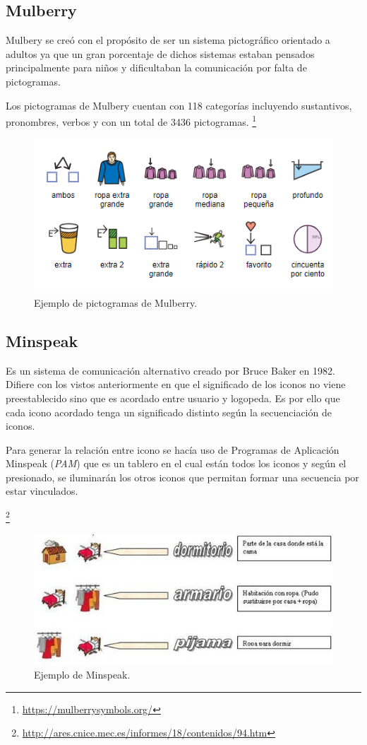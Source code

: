 \newpage
\subsection{Mulberry}
Mulbery se creó con el propósito de ser un sistema pictográfico orientado a adultos ya que un gran porcentaje de dichos sistemas estaban pensados principalmente para niños y dificultaban la comunicación por falta de pictogramas.

Los pictogramas de Mulbery cuentan con 118 categorías incluyendo sustantivos, pronombres, verbos y con un total de 3436 pictogramas.
\footnote{\url{https://mulberrysymbols.org/}}


\begin{figure}[h!]
	\centering
	\includegraphics[scale=0.7]{Imagenes/Bitmap/Mulberry}
	\caption{Ejemplo de pictogramas de Mulberry.}
	\label{fig:mulberry}
\end{figure}

\newpage
\subsection{Minspeak}
Es un sistema de comunicación alternativo creado por Bruce Baker en 1982. Difiere con los vistos anteriormente en que el significado de los iconos no viene preestablecido sino que es acordado entre usuario y logopeda. Es por ello que cada icono acordado tenga un significado distinto según la secuenciación de iconos.

Para generar la relación entre icono se hacía uso de Programas de Aplicación Minspeak (\textit{PAM}) que es un tablero en el cual están todos los iconos y según el presionado, se iluminarán los otros iconos que permitan formar una secuencia por estar vinculados.

\footnote{\url{http://ares.cnice.mec.es/informes/18/contenidos/94.htm}}
\begin{figure}[h!]
	\centering
	\includegraphics[width=0.7\linewidth]{Imagenes/Bitmap/Minspeak}
	\caption{Ejemplo de Minspeak.}
	\label{fig:minspeak}
\end{figure}


